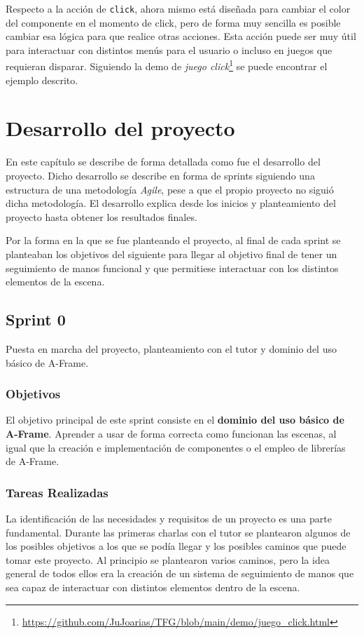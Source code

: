 \documentclass[a4paper, 12pt]{book}
\begin{document}
Respecto a la acción de \texttt{click}, ahora mismo está diseñada para cambiar el color del componente en el momento de click, pero de forma muy sencilla es posible cambiar esa lógica para que realice otras acciones. Esta acción puede ser muy útil para interactuar con distintos menús para el usuario o incluso en juegos que requieran disparar. Siguiendo la demo de \textit{juego click}\footnote{\url{https://github.com/JuJoarias/TFG/blob/main/demo/juego_click.html}} se puede encontrar el ejemplo descrito.

\cleardoublepage
\chapter{Desarrollo del proyecto}
\label{chap:Desarrollo del proyecto}
En este capítulo se describe de forma detallada como fue el desarrollo del proyecto. Dicho desarrollo
se describe en forma de sprints siguiendo una estructura de una metodología \textit{Agile}\cite{asana_agile_methodology}, pese a que el propio proyecto no siguió dicha metodología. 
El desarrollo explica desde los inicios y planteamiento del proyecto hasta obtener los resultados finales.

Por la forma en la que se fue planteando el proyecto, al final de cada sprint se planteaban los objetivos del siguiente para llegar al objetivo final de tener un seguimiento de manos funcional y que permitiese interactuar con los distintos elementos de la escena. 
\section{Sprint 0}
\label{sec:sprint0}
Puesta en marcha del proyecto, planteamiento con el tutor y dominio del uso básico de A-Frame.
\subsection{Objetivos}
\label{subsec:objetivo-principal0}
El objetivo principal de este sprint consiste en el \textbf{dominio del uso básico de A-Frame}. Aprender a usar de forma correcta como funcionan las escenas, al igual que la creación e implementación de componentes o el empleo de librerías de A-Frame.

\subsection{Tareas Realizadas}
\label{subsec:implementacion0}
La identificación de las necesidades y requisitos de un proyecto es una parte fundamental. Durante las primeras charlas con el tutor se plantearon algunos de los posibles objetivos a los que se podía llegar y los posibles caminos que puede tomar este proyecto. 
Al principio se plantearon varios caminos, pero la idea general de todos ellos era la creación de un sistema de seguimiento de manos que sea capaz de interactuar con distintos elementos dentro de la escena. 
\end{document}
